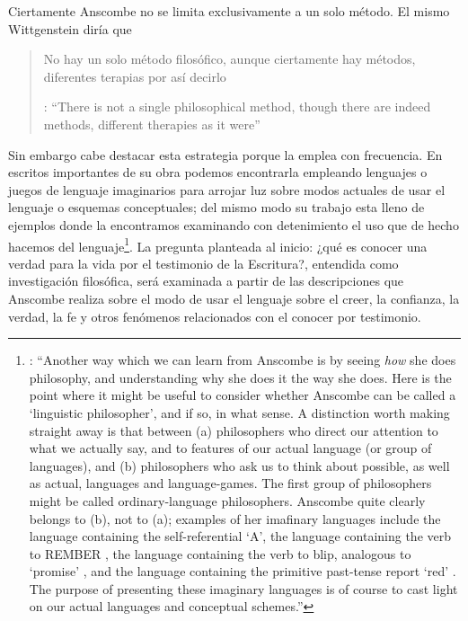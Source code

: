 Ciertamente Anscombe no se limita exclusivamente a un solo método. El mismo Wittgenstein diría que \blockquote[{\cite[\S133]{wittgenstein1953phiinv}}: \enquote{There is not a single philosophical method, though there are indeed methods, different therapies as it were}]{No hay un solo método filosófico, aunque ciertamente hay métodos, diferentes terapias por así decirlo}. Sin embargo cabe destacar esta estrategia porque la emplea con frecuencia. En escritos importantes de su obra podemos encontrarla empleando lenguajes o juegos de lenguaje imaginarios para arrojar luz sobre modos actuales de usar el lenguaje o esquemas conceptuales; del mismo modo su trabajo esta lleno de ejemplos donde la encontramos examinando con detenimiento el uso que de hecho hacemos del lenguaje\footnote{\cite[Cf.~][228-229]{teichmann2008ans}: \enquote{Another way which we can learn from Anscombe is by seeing \emph{how} she does philosophy, and understanding why she does it the way she does. Here is the point where it might be useful to consider whether Anscombe can be called a `linguistic philosopher', and if so, in what sense. A distinction worth making straight away is that between (a) philosophers who direct our attention to what we actually say, and to features of our actual language (or group of languages), and (b) philosophers who ask us to think about possible, as well as actual, languages and language-games. The first group of philosophers might be called ordinary-language philosophers. Anscombe quite clearly belongs to (b), not to (a); examples of her imafinary languages include the language containing the self-referential `A', the language containing the verb to REMBER \textelp{}, the language containing the verb to blip, analogous to `promise' \textelp{}, and the language containing the primitive past-tense report `red' \textelp{}. The purpose of presenting these imaginary languages is of course to cast light on our actual languages and conceptual schemes.}}.
La pregunta planteada al inicio: ¿qué es conocer una verdad para la vida por el testimonio de la Escritura?, entendida como investigación filosófica, será examinada a partir de las descripciones que Anscombe realiza sobre el modo de usar el lenguaje sobre el creer, la confianza, la verdad, la fe y otros fenómenos relacionados con el conocer por testimonio.

